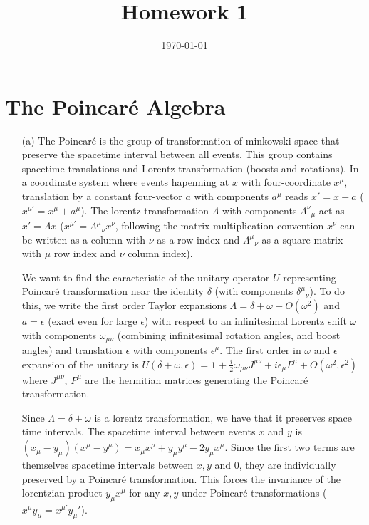 \documentclass[10pt, a4paper]{article}
\title{Homework 1} %
\author{\PA} %
\date{\today} %
\begin{document}
\maketitlepage

\maketableofcontents


\section{The Poincaré Algebra}
\begin{enumerate}
  \item[(a)] The Poincaré is the group of transformation of minkowski space that preserve the spacetime interval between all events. This group contains spacetime translations and Lorentz transformation (boosts and rotations). In a coordinate system where events hapenning at $x$ with four-coordinate $x^{\mu}$, translation by a constant four-vector $a$ with components  $a^\mu$ reads $x' = x + a$ ($x^{\mu'} = x^{\mu} + a^{\mu}$). The lorentz transformation $\Lambda$ with components $\Lambda^{\nu}{}_{\mu}$ act as $x' = \Lambda x$ ($x^{\mu'} = \Lambda^{\mu}{}_{\nu} x^{\nu}$, following the matrix multiplication convention $x^\nu$ can be written as a column with $\nu$ as a row index and $\Lambda^{\mu}{}_{\nu}$ as a square matrix with $\mu$ row index and $\nu$ column index). 
  
  We want to find the caracteristic of the unitary operator $U$ representing Poincaré transformation near the identity $\delta$ (with components $\delta^{\mu}{}_{\nu}$). To do this, we write the first order Taylor expansions $\Lambda = \delta + \omega + O(\omega^2)$ and $a = \epsilon$ (exact even for large $\epsilon$) with respect to an infinitesimal Lorentz shift $\omega$ with components $\omega_{\mu \nu}$ (combining infinitesimal rotation angles, and boost angles) and translation $\epsilon$ with components $\epsilon^\mu$. The first order in $\omega$ and $\epsilon$ expansion of the unitary is $U(\delta+\omega, \epsilon)=\mathbf{1}+\frac{i}{2} \omega_{\mu \nu} J^{\mu \nu}+i \epsilon_\mu P^\mu + O(\omega^2, \epsilon^2)$ where $J^{\mu \nu}$, $P^\mu$ are the hermitian matrices generating the Poincaré transformation. 
  
  Since $\Lambda = \delta + \omega$ is a lorentz transformation, we have that it preserves space time intervals. The spacetime interval between events $x$ and $y$ is $(x_\mu-y_\mu)(x^\mu-y^\mu) = x_\mu x^\mu + y_\mu y^\mu - 2 y_\mu x^\mu $. Since the first two terms are themselves spacetime intervals between $x, y$ and $0$, they are individually preserved by a Poincaré transformation. This forces the invariance of the lorentzian product $y_\mu x^\mu$ for any $x, y$ under Poincaré transformations ($x^\mu y_\mu = x^{\mu'} y_\mu'$).
  

\end{enumerate}
\end{document}
